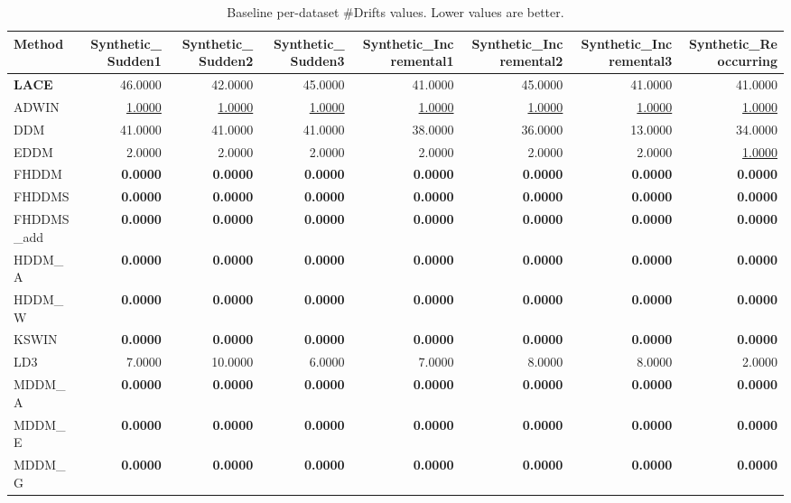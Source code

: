 \begin{table}
\caption{Baseline per-dataset \#Drifts values. Lower values are better.}
\label{tab:per-data-baseline-n-drifts-detected}
\begin{tabular}{lrrrrrrr}
\toprule
Method & Synthetic\_Sudden1 & Synthetic\_Sudden2 & Synthetic\_Sudden3 & Synthetic\_Incremental1 & Synthetic\_Incremental2 & Synthetic\_Incremental3 & Synthetic\_Reoccurring \\
\midrule
\textbf{LACE} & 46.0000 & 42.0000 & 45.0000 & 41.0000 & 45.0000 & 41.0000 & 41.0000 \\
ADWIN & \underline{1.0000} & \underline{1.0000} & \underline{1.0000} & \underline{1.0000} & \underline{1.0000} & \underline{1.0000} & \underline{1.0000} \\
DDM & 41.0000 & 41.0000 & 41.0000 & 38.0000 & 36.0000 & 13.0000 & 34.0000 \\
EDDM & 2.0000 & 2.0000 & 2.0000 & 2.0000 & 2.0000 & 2.0000 & \underline{1.0000} \\
FHDDM & \textbf{0.0000} & \textbf{0.0000} & \textbf{0.0000} & \textbf{0.0000} & \textbf{0.0000} & \textbf{0.0000} & \textbf{0.0000} \\
FHDDMS & \textbf{0.0000} & \textbf{0.0000} & \textbf{0.0000} & \textbf{0.0000} & \textbf{0.0000} & \textbf{0.0000} & \textbf{0.0000} \\
FHDDMS\_add & \textbf{0.0000} & \textbf{0.0000} & \textbf{0.0000} & \textbf{0.0000} & \textbf{0.0000} & \textbf{0.0000} & \textbf{0.0000} \\
HDDM\_A & \textbf{0.0000} & \textbf{0.0000} & \textbf{0.0000} & \textbf{0.0000} & \textbf{0.0000} & \textbf{0.0000} & \textbf{0.0000} \\
HDDM\_W & \textbf{0.0000} & \textbf{0.0000} & \textbf{0.0000} & \textbf{0.0000} & \textbf{0.0000} & \textbf{0.0000} & \textbf{0.0000} \\
KSWIN & \textbf{0.0000} & \textbf{0.0000} & \textbf{0.0000} & \textbf{0.0000} & \textbf{0.0000} & \textbf{0.0000} & \textbf{0.0000} \\
LD3 & 7.0000 & 10.0000 & 6.0000 & 7.0000 & 8.0000 & 8.0000 & 2.0000 \\
MDDM\_A & \textbf{0.0000} & \textbf{0.0000} & \textbf{0.0000} & \textbf{0.0000} & \textbf{0.0000} & \textbf{0.0000} & \textbf{0.0000} \\
MDDM\_E & \textbf{0.0000} & \textbf{0.0000} & \textbf{0.0000} & \textbf{0.0000} & \textbf{0.0000} & \textbf{0.0000} & \textbf{0.0000} \\
MDDM\_G & \textbf{0.0000} & \textbf{0.0000} & \textbf{0.0000} & \textbf{0.0000} & \textbf{0.0000} & \textbf{0.0000} & \textbf{0.0000} \\

\end{tabular}
\end{table}
